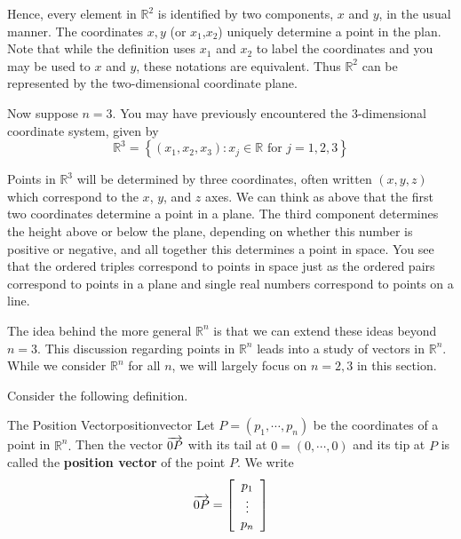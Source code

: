 Hence, every element in $\mathbb{R}^2$ is identified by two
components, $x$ and $y$, in the usual manner. The coordinates $x, y$ (or $x_1$,$x_2$) uniquely determine a point in the plan. Note that while the definition uses $x_1$ and $x_2$ to label the coordinates and you may be used to $x$ and $y$, these notations are equivalent. Thus $\mathbb{R}^2$ can be represented by the two-dimensional coordinate plane.

Now suppose $n=3$. You may have previously encountered the $3$-dimensional
coordinate system, given by
\begin{equation*}
\mathbb{R}^{3}=
\left\{ \left( x_{1}, x_{2}, x_{3}\right)
:x_{j}\in \mathbb{R}\text{ for }j=1,2,3 \right\}
\end{equation*}

Points in $\mathbb{R}^3$ will be determined by three
coordinates, often written $\left(x,y,z\right)$ which correspond to the $x$, $y$,
and $z$ axes.  We can think as above that the first two coordinates
determine a point in a plane. The third component determines the
height above or below the plane, depending on whether this number is
positive or negative, and all together this determines a point in
space. You
see that the ordered triples correspond to points in space just as the
ordered pairs correspond to points in a plane and single real numbers
correspond to points on a line.

The idea behind the more general $\mathbb{R}^n$ is that we can extend
these ideas beyond $n = 3.$ This discussion regarding points in $\mathbb{R}^n$ leads into a study of vectors in $\mathbb{R}^n$. While we consider $\mathbb{R}^n$ for all $n$,
we will largely  focus on $n=2,3$ in this section. 

Consider the following definition.

\begin{definition}{The Position Vector}{positionvector}
Let $P=\left( p_{1},\cdots ,p_{n}\right) $ be the coordinates of a
point in $\mathbb{R}^{n}.$ Then the vector $\overrightarrow{0P}$ with its tail at
$0=\left( 0,\cdots ,0\right) $ and its tip at 
$P$ is called the \textbf{position vector }of
  the point $P$. 
We write 
\begin{equation*}
\overrightarrow{0P} = \left[ 
\begin{array}{c}
p_{1} \\
\vdots \\
p_{n}
\end{array} \right]
\end{equation*}
\end{definition}

